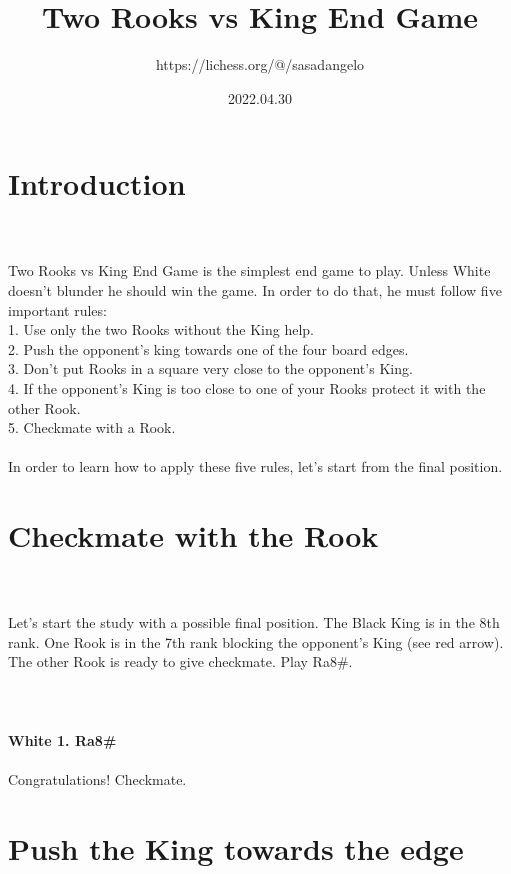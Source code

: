 \documentclass{article}
\title{Two Rooks vs King End Game}
\author{https://lichess.org/@/sasadangelo}
\date{2022.04.30}
\begin{document}
\begin{titlepage}
\maketitle
\end{titlepage}
\section{ Introduction}

\\
\\
Two Rooks vs King End Game is the simplest end game to play. Unless White doesn't blunder he should win the game. In order to do that, he must follow five important rules:\\1. Use only the two Rooks without the King help.\\2. Push the opponent's king towards one of the four board edges.\\3. Don't put Rooks in a square very close to the opponent's King.\\4. If the opponent's King is too close to one of your Rooks protect it with the other Rook.\\5. Checkmate with a Rook.\\\\In order to learn how to apply these five rules, let's start from the final position.\section{ Checkmate with the Rook}

\\
\\
Let's start the study with a possible final position. The Black King is in the 8th rank. One Rook is in the 7th rank blocking the opponent's King (see red arrow). The other Rook is ready to give checkmate. Play Ra8\#.\\\\

\\
\\
\textbf{White 1. Ra8\#}\\
\\
Congratulations! Checkmate.\section{ Push the King towards the edge}
\end{document}
